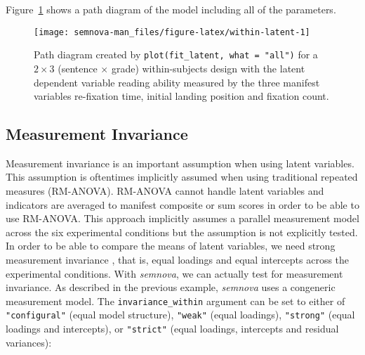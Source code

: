 \documentclass[
]{book}
\begin{document}
Figure~\ref{fig:within-latent} shows a path diagram of the model including all of the parameters.

\begin{figure}

{\centering \texttt{[image: semnova-man\_files/figure-latex/within-latent-1]} 

}

\caption{Path diagram created by \texttt{plot(fit\_latent, what = "all")} for a $2 \times 3$ (sentence $\times$ grade) within-subjects design with the latent dependent variable reading ability measured by the three manifest variables re-fixation time, initial landing position and fixation count.}\label{fig:within-latent}
\end{figure}

\hypertarget{measurement-invariance}{%
\subsection{Measurement Invariance}\label{measurement-invariance}}

Measurement invariance is an important assumption when using latent variables. This assumption is oftentimes implicitly assumed when using traditional repeated measures (RM-ANOVA). RM-ANOVA cannot handle latent variables and indicators are averaged to manifest composite or sum scores in order to be able to use RM-ANOVA. This approach implicitly assumes a parallel measurement model across the six experimental conditions but the assumption is not explicitly tested. In order to be able to compare the means of latent variables, we need strong measurement invariance \citep[see][Section 2.4 ``Latent Repeated Measures ANOVA (L-RM-ANOVA)'']{Langenberg2022z}, that is, equal loadings and equal intercepts across the experimental conditions. With \emph{semnova}, we can actually test for measurement invariance. As described in the previous example, \emph{semnova} uses a congeneric measurement model. The \texttt{invariance\_within} argument can be set to either of \texttt{"configural"} (equal model structure), \texttt{"weak"} (equal loadings), \texttt{"strong"} (equal loadings and intercepts), or \texttt{"strict"} (equal loadings, intercepts and residual variances):
\end{document}
